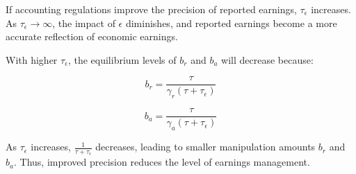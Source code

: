\documentclass{article}
\begin{document}
If accounting regulations improve the precision of reported earnings, \( \tau_\epsilon \) increases. As \( \tau_\epsilon \rightarrow \infty \), the impact of \( \epsilon \) diminishes, and reported earnings become a more accurate reflection of economic earnings.

With higher \( \tau_\epsilon \), the equilibrium levels of \( b_r \) and \( b_a \) will decrease because:

\[
b_r = \frac{\tau}{\gamma_r (\tau + \tau_\epsilon)}
\]

\[
b_a = \frac{\tau}{\gamma_a (\tau + \tau_\epsilon)}
\]

As \( \tau_\epsilon \) increases, \( \frac{1}{\tau + \tau_\epsilon} \) decreases, leading to smaller manipulation amounts \( b_r \) and \( b_a \). Thus, improved precision reduces the level of earnings management.
\end{document}
